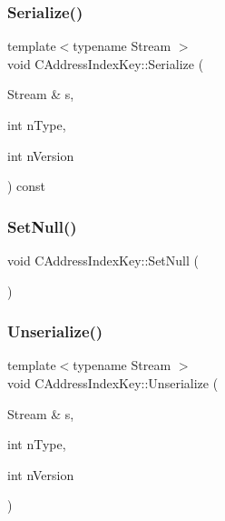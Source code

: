 \subsubsection{\texorpdfstring{Serialize()}{Serialize()}}
{\footnotesize\ttfamily template$<$typename Stream $>$ \\
void C\+Address\+Index\+Key\+::\+Serialize (\begin{DoxyParamCaption}\item[{Stream \&}]{s,  }\item[{int}]{n\+Type,  }\item[{int}]{n\+Version }\end{DoxyParamCaption}) const\hspace{0.3cm}{\ttfamily [inline]}}

\mbox{\label{struct_c_address_index_key_abb825d2c63b741ab3c7c280511f6cd13}} 
\subsubsection{\texorpdfstring{Set\+Null()}{SetNull()}}
{\footnotesize\ttfamily void C\+Address\+Index\+Key\+::\+Set\+Null (\begin{DoxyParamCaption}{ }\end{DoxyParamCaption})\hspace{0.3cm}{\ttfamily [inline]}}

\mbox{\label{struct_c_address_index_key_a31da9e393f8c79a697357e117ad02c40}} 
\subsubsection{\texorpdfstring{Unserialize()}{Unserialize()}}
{\footnotesize\ttfamily template$<$typename Stream $>$ \\
void C\+Address\+Index\+Key\+::\+Unserialize (\begin{DoxyParamCaption}\item[{Stream \&}]{s,  }\item[{int}]{n\+Type,  }\item[{int}]{n\+Version }\end{DoxyParamCaption})\hspace{0.3cm}{\ttfamily [inline]}}



